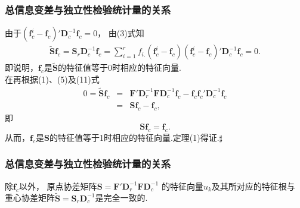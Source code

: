 \begin{frame}\frametitle{\color{blue}总信息变差与独立性检验统计量的关系}

\begin{footnotesize}
 {}\quad 由于$(\mathbf{f}^{i}_{c}-\mathbf{f}_{c})'\mathbf{D}_{c}^{-1}\mathbf{f}_{c}=0$，
                  由(3)式知
\begin{eqnarray}
                   \mathbf{\widetilde{S}}\mathbf{f}_{c}=\mathbf{S}_{r}\mathbf{D}_{c}^{-1}\mathbf{f}_{c}=
                      \sum^{r}_{i=1}f_{i.}(\mathbf{f}^{i}_{c}-\mathbf{f}_{c})(\mathbf{f}^{i}_{c}-\mathbf{f}_{c})'
                       \mathbf{D}_{c}^{-1}\mathbf{f}_{c}=0.
\end{eqnarray}
即说明，$\mathbf{f}_{c}$是$\mathbf{\widetilde{S}}$的特征值等于0时相应的特征向量.\\
在再根据(1)、(5)及(11)式
       \begin{eqnarray}
          0=\mathbf{\widetilde{S}}\mathbf{f}_{c}&=&
                \mathbf{F}'\mathbf{D}_{r}^{-1}\mathbf{F}\mathbf{D}_{c}^{-1}\mathbf{f}_{c}
                -\mathbf{f}_{c}\mathbf{f}_{c}'\mathbf{D}_{c}^{-1}\mathbf{f}_{c}   \nonumber\\
                &=&\mathbf{S}\mathbf{f}_{c}-\mathbf{f}_{c},
       \end{eqnarray}
即
                  $$\mathbf{S}\mathbf{f}_{c}=\mathbf{f}_{c}.$$
 从而，$\mathbf{f}_{c}$是$\mathbf{S}$的特征值等于1时相应的特征向量.定理(1)得证.\quad $\sharp$

 \end{footnotesize}
\end{frame}
\begin{frame}\frametitle{\color{blue}总信息变差与独立性检验统计量的关系}

 \quad{}
         除$\mathbf{f}_{c}$以外，
        原点协差矩阵$\mathbf{S}=\mathbf{F}'\mathbf{D}_{r}^{-1}\mathbf{F}\mathbf{D}_{c}^{-1}$
        的特征向量$u_{k}$及其所对应的特征根与
        重心协差矩阵$\mathbf{\widetilde{S}}=\mathbf{S}_{r}\mathbf{D}_{c}^{-1}$是完全一致的.

\end{frame}

